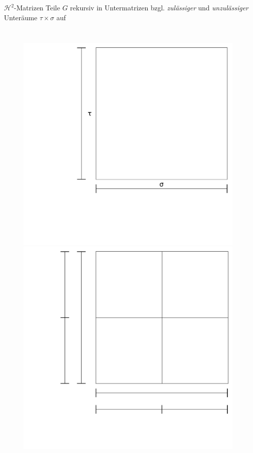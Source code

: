 \documentclass[10pt]{beamer}
\begin{document}
\begin{frame}{\(\mathcal{H}^2\)-Matrizen}
  Teile \( G \) rekursiv in Untermatrizen bzgl. \textit{zulässiger} und
  \textit{unzulässiger} Unteräume \( \tau \times \sigma \) auf

  \begin{columns}
      \begin{figure}
        \begin{overprint}
          \centering\includegraphics[width=\linewidth]{figures/fg-h2-matrix-1.pdf}
          \centering\includegraphics[width=\linewidth]{figures/fg-h2-matrix-2.pdf}

\end{overprint}
\end{figure}
\end{columns}
\end{frame}
\end{document}
